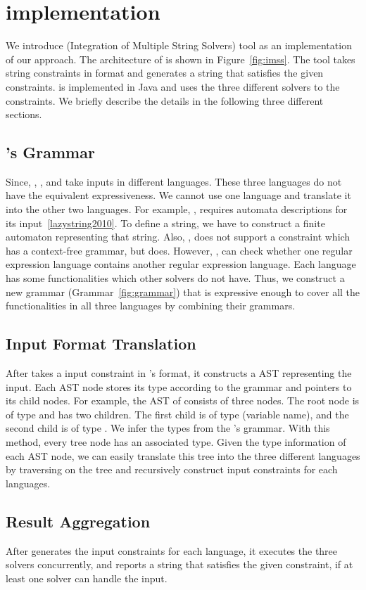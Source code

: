 \section{implementation}
\label{sec:implementation}
We introduce \imss (Integration of Multiple String Solvers) tool as
an implementation of our approach. The architecture of \imss is shown
in Figure~\ref{fig:imss}. The tool takes string constraints in \imss format
and generates a string that satisfies the given constraints. \imss is
implemented in Java and uses the three different solvers to the constraints.
We briefly describe the details in the following three different sections.

\subsection{\imss's Grammar}
Since, \hampi, \dprle, and \zstr take inputs in
 different languages. These three languages do not have the equivalent expressiveness.
 We cannot use one language and translate it into the other two languages. For example,
 \dprle, requires automata descriptions for its input~\ref{lazystring2010}.
 To define a string, we have to construct a finite automaton representing that string.
 Also, \dprle, does not support a constraint which has a context-free grammar,
 but \hampi does. However, \dprle, can check whether one regular expression language
 contains another regular expression language. Each language has some functionalities which
 other solvers do not have. Thus, we construct a new grammar (Grammar~\ref{fig:grammar}) that is expressive enough to
 cover all the functionalities in all three languages by combining their grammars.

\subsection{Input Format Translation}
After \imss takes a input constraint in \imss's format, it constructs a AST representing the input.
Each AST node stores its type according to the grammar and pointers to its child nodes.
For example, the AST of  consists of three nodes. The root node is of type
 and has two children. The first child is of type  (variable name), and
the second child is of type . We infer the types from the \imss's grammar.
With this method, every tree node has an associated type. Given the type information of
each AST node, we can easily translate this tree into the three different languages by traversing
on the tree and recursively construct input constraints for each languages.

\subsection{Result Aggregation}
After \imss generates the input constraints for each language, it executes the three solvers concurrently, and
reports a string that satisfies the given constraint, if at least one solver can handle the input.
